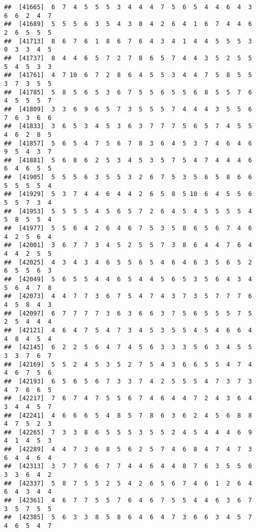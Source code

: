 \documentclass[
]{book}
\begin{document}
\begin{verbatim}
##  [41665]  6  7  4  5  5  5  3  4  4  4  7  5  6  5  4  4  6  4  3  6  6  2  4  7
##  [41689]  5  5  5  6  3  5  4  3  8  4  2  6  4  1  6  7  4  4  6  2  6  5  5  5
##  [41713]  8  6  7  6  1  8  6  7  6  4  3  4  1  4  4  5  5  5  3  0  3  3  4  5
##  [41737]  8  4  4  6  5  7  2  7  8  6  5  7  4  4  3  5  2  5  5  5  4  5  3  3
##  [41761]  4  7 10  6  7  2  8  6  4  5  5  3  4  4  7  5  8  5  5  3  7  3  5  5
##  [41785]  5  8  5  6  5  3  6  7  5  5  6  5  5  6  8  5  5  7  6  4  5  5  5  7
##  [41809]  3  3  6  9  6  5  7  3  5  5  5  7  4  4  4  3  5  5  6  7  6  3  6  6
##  [41833]  3  6  5  3  4  5  3  6  3  7  7  7  5  6  5  7  4  5  5  4  6  2  8  5
##  [41857]  5  6  5  4  7  5  6  7  8  3  6  4  5  3  7  4  6  4  6  9  5  4  3  7
##  [41881]  5  6  8  6  2  5  3  4  5  3  5  7  5  4  7  4  4  4  6  6  4  6  5  5
##  [41905]  5  5  5  6  3  5  5  3  2  6  7  5  3  5  6  5  8  6  6  5  5  5  5  4
##  [41929]  5  3  7  4  4  6  4  4  2  6  5  8  5 10  6  4  5  5  6  5  5  7  3  4
##  [41953]  5  5  5  5  4  5  6  5  7  2  6  4  5  4  5  5  5  5  4  5  8  5  5  4
##  [41977]  5  5  6  4  2  6  4  6  7  5  3  5  8  6  5  6  7  4  6  4  2  5  6  4
##  [42001]  3  6  7  7  3  4  5  2  5  5  7  3  8  6  4  4  7  6  4  4  4  2  5  5
##  [42025]  4  3  4  3  4  6  5  5  6  5  4  6  4  6  3  5  6  5  2  6  5  5  6  3
##  [42049]  5  6  5  5  4  4  6  5  4  4  5  6  5  3  5  6  4  3  4  5  6  4  7  8
##  [42073]  4  4  7  7  3  6  7  5  4  7  4  3  7  3  5  7  7  7  6  4  5  8  4  3
##  [42097]  6  7  7  7  7  3  6  3  6  6  3  7  5  6  5  5  5  7  5  2  5  4  4  4
##  [42121]  4  6  4  7  5  4  7  3  4  5  3  5  5  4  5  4  6  6  4  4  8  4  5  4
##  [42145]  6  2  2  5  6  4  7  4  5  6  3  3  3  5  6  3  4  5  5  3  3  7  6  7
##  [42169]  5  5  2  4  5  3  5  2  7  5  4  3  6  6  5  5  4  7  4  4  6  7  5  6
##  [42193]  6  5  6  5  6  7  3  3  7  4  2  5  5  5  4  7  3  7  3  4  7  6  6  5
##  [42217]  7  6  7  4  7  5  5  6  7  4  6  4  4  7  2  4  3  6  4  3  4  4  5  7
##  [42241]  4  6  6  6  5  4  8  5  7  8  6  3  6  2  4  5  6  8  8  4  7  5  2  3
##  [42265]  7  3  3  8  6  5  5  5  3  5  5  2  4  5  4  4  4  6  9  4  1  4  5  3
##  [42289]  4  4  7  3  6  8  5  6  2  5  7  4  6  8  4  7  4  7  3  6  4  4  6  4
##  [42313]  3  7  7  6  6  7  7  4  4  6  4  4  8  7  6  3  5  5  6  3  3  6  4  2
##  [42337]  5  8  7  5  5  2  5  4  2  6  5  6  7  4  6  1  2  6  4  6  4  3  4  4
##  [42361]  4  6  7  7  5  5  7  6  4  6  7  5  5  4  4  6  3  6  7  3  5  7  5  5
##  [42385]  5  6  3  3  8  5  8  6  4  6  4  7  3  6  6  3  4  5  7  4  6  5  4  7

\end{verbatim}
\end{document}
